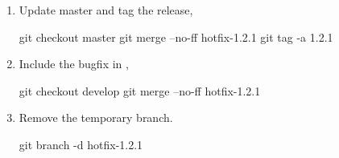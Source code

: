 \begin{enumerate}
	\item Update master and tag the release,
\begin{git-bash}
    git checkout master
    git merge --no-ff hotfix-1.2.1
    git tag -a 1.2.1
\end{git-bash}
	
	\item Include the bugfix in ,
\begin{git-bash}
    git checkout develop
    git merge --no-ff hotfix-1.2.1
\end{git-bash}

	\item Remove the temporary branch.
\begin{git-bash}
    git branch -d hotfix-1.2.1
\end{git-bash}
\end{enumerate}














